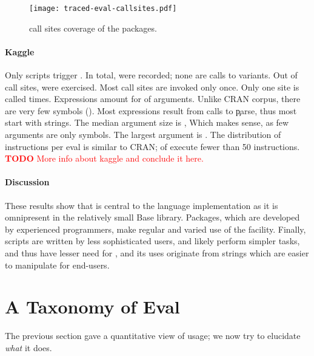 \documentclass[screen,acmsmall]{acmart}
\newcommand{\authorcomment}[3]{\xspace\textcolor{#1}{{\bf #2} #3}\xspace}
\newcommand{\todo}[1]{\authorcomment{red}{TODO}{#1}}
\begin{document}
\begin{figure}[tb] \centering
  \texttt{[image: traced-eval-callsites.pdf]} \centering
  \caption{\eval call sites coverage of the \PkgPackages packages.}%
  \label{fig:traced-eval-callsites}
\end{figure}

\paragraph{Kaggle}
Only \kaggleNbruns scripts trigger \eval. In total, \kaggleAllcalls \eval were
recorded; none are calls to variants. Out of \kaggleStaticeval call sites,
\kaggleTriggeredeval were exercised. Most call sites are invoked only once. Only
one site is called \kaggleMaxcalls times. Expressions amount for
\kaggleCodepercent of arguments. Unlike CRAN corpus, there are very few symbols
(\kaggleSymbolpercent). Most expressions result from calls to \c{parse}, thus
most \evals start with strings. The median argument size is \kaggleMedianszeval,
Which makes sense, as few arguments are only symbols. The largest argument is
\kaggleMaxszeval. The distribution of instructions per eval is similar to CRAN;
\kaggleSmalleventspct of \evals execute fewer than 50 instructions.
\todo{More info about kaggle and conclude it here.}


\paragraph{Discussion}
These results show that \eval is central to the language implementation as it is
omnipresent in the relatively small Base library. Packages, which are developed
by experienced programmers, make regular and varied use of the facility.
Finally, scripts are written by less sophisticated users, and likely perform
simpler tasks, and thus have lesser need for \eval, and its uses originate from
strings which are easier to manipulate for end-users.

\newpage
\section{A Taxonomy of Eval}

The previous section gave a quantitative view of \eval usage; we now try to
elucidate \emph{what} it does.
\end{document}
